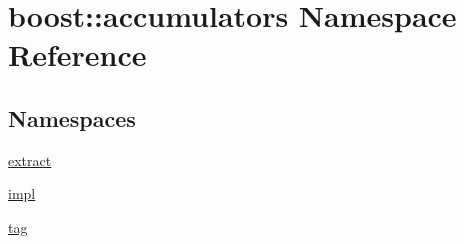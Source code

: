\hypertarget{namespaceboost_1_1accumulators}{}\section{boost\+:\+:accumulators Namespace Reference}
\label{namespaceboost_1_1accumulators}
\subsection*{Namespaces}
\begin{DoxyCompactItemize}
\item 
 \hyperlink{namespaceboost_1_1accumulators_1_1extract}{extract}
\item 
 \hyperlink{namespaceboost_1_1accumulators_1_1impl}{impl}
\item 
 \hyperlink{namespaceboost_1_1accumulators_1_1tag}{tag}
\end{DoxyCompactItemize}
